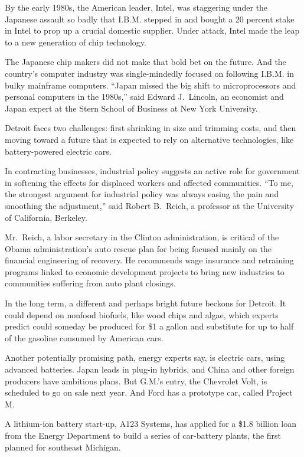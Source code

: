 \documentclass[12pt,a4paper,onecolumn]{article}
\begin{document}
By the early 1980s, the American leader, Intel, was staggering under the Japanese assault so badly
that I.B.M. stepped in and bought a 20 percent stake in Intel to prop up a crucial domestic
supplier. Under attack, Intel made the leap to a new generation of chip technology.

The Japanese chip makers did not make that bold bet on the future. And the country's computer
industry was single-mindedly focused on following I.B.M. in bulky mainframe computers. ``Japan
missed the big shift to microprocessors and personal computers in the 1980s,'' said Edward
J.~Lincoln, an economist and Japan expert at the Stern School of Business at New York University.

Detroit faces two challenges: first shrinking in size and trimming costs, and then moving toward a
future that is expected to rely on alternative technologies, like battery-powered electric cars.

In contracting businesses, industrial policy suggests an active role for government in softening the
effects for displaced workers and affected communities. ``To me, the strongest argument for
industrial policy was always easing the pain and smoothing the adjustment,'' said Robert B.~Reich, a
professor at the University of California, Berkeley.

Mr.~Reich, a labor secretary in the Clinton administration, is critical of the Obama
administration's auto rescue plan for being focused mainly on the financial engineering of recovery.
He recommends wage insurance and retraining programs linked to economic development projects to
bring new industries to communities suffering from auto plant closings.

In the long term, a different and perhaps bright future beckons for Detroit. It could depend on
nonfood biofuels, like wood chips and algae, which experts predict could someday be produced for \$1
a gallon and substitute for up to half of the gasoline consumed by American cars.

Another potentially promising path, energy experts say, is electric cars, using advanced batteries.
Japan leads in plug-in hybrids, and China and other foreign producers have ambitious plans. But
G.M.'s entry, the Chevrolet Volt, is scheduled to go on sale next year. And Ford has a prototype
car, called Project M.

A lithium-ion battery start-up, A123 Systems, has applied for a \$1.8 billion loan from the Energy
Department to build a series of car-battery plants, the first planned for southeast Michigan.
\end{document}
